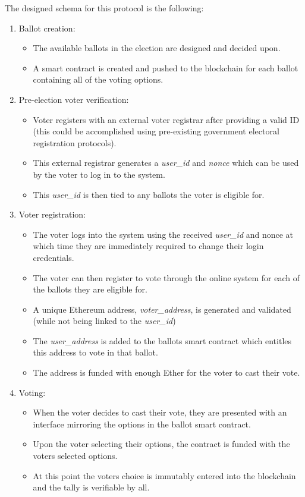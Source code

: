 \documentclass{article}
\begin{document}
The designed schema for this protocol is the following:
\begin{enumerate}

\item Ballot creation:
	\begin{itemize}
		\item The available ballots in the election are designed and decided upon.
		\item A smart contract is created and pushed to the blockchain for each ballot containing all of the voting options.
	\end{itemize}

\item Pre-election voter verification:
	\begin{itemize}
		\item Voter registers with an external voter registrar after providing a valid ID (this could be accomplished using pre-existing government electoral registration protocols).
		\item This external registrar generates a \textit{user\_id} and \textit{nonce} which can be used by the voter to log in to the system.
		\item This \textit{user\_id} is then tied to any ballots the voter is eligible for.
	\end{itemize}
	
\item Voter registration:
	\begin{itemize}
		\item The voter logs into the system using the received \textit{user\_id} and nonce at which time they are immediately required to change their login credentials.
		\item The voter can then register to vote through the online system for each of the ballots they are eligible for.
		\item A unique Ethereum address, \textit{voter\_address}, is generated and validated (while not being linked to the \textit{user\_id})
		\item The \textit{user\_address} is added to the ballots smart contract which entitles this address to vote in that ballot.
		\item The address is funded with enough Ether for the voter to cast their vote.
	\end{itemize}

\item Voting:
	\begin{itemize}
		\item When the voter decides to cast their vote, they are presented with an interface mirroring the options in the ballot smart contract.
		\item Upon the voter selecting their options, the contract is funded with the voters selected options.
		\item At this point the voters choice is immutably entered into the blockchain and the tally is verifiable by all.
	\end{itemize}


\end{enumerate}
\end{document}
